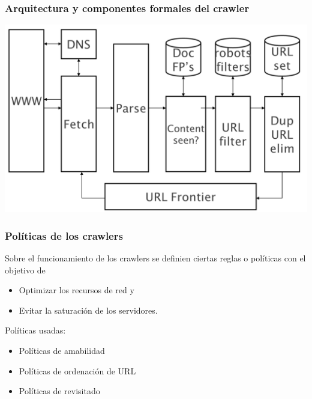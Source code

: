 \documentclass[
10pt, %
aspectratio=169, %
]{beamer}
\begin{document}
	\begin{frame}
		
		\frametitle{Arquitectura y componentes formales del crawler}
		
		\centering 
		\includegraphics[scale=0.5]{arq-f-crawler.png}
		
		
	\end{frame}
	
	\begin{frame}
		
		\frametitle{Políticas de los crawlers}
		
		Sobre el funcionamiento de los crawlers se definien ciertas reglas o políticas con el objetivo de 
		\begin{itemize}
			\item Optimizar los recursos de red y
			\item Evitar la saturación de los servidores.
		\end{itemize} 
		
		\vspace{2\baselineskip}
		
		Políticas usadas:
		\begin{itemize}
			\item Políticas de amabilidad
			\item Políticas de ordenación de URL
			\item Políticas de revisitado
		\end{itemize}
		
	\end{frame}
	
\end{document}
